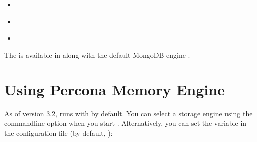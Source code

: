\documentclass[letterpaper,10pt,english]{sphinxmanual}
\begin{document}
\begin{sphinxShadowBox}
\begin{itemize}
\item {} 
\sphinxAtStartPar
{}\label{\detokenize{inmemory:id3}}{\hyperref[\detokenize{inmemory:using-percona-memory-engine}]{}}

\item {} 
\sphinxAtStartPar
{}\label{\detokenize{inmemory:id4}}{\hyperref[\detokenize{inmemory:switching-storage-engines}]{}}

\item {} 
\sphinxAtStartPar
{}\label{\detokenize{inmemory:id5}}{\hyperref[\detokenize{inmemory:configuring-percona-memory-engine}]{}}

\end{itemize}
\end{sphinxShadowBox}

\sphinxAtStartPar
The  is available in  along with the default
MongoDB engine .


\section{Using Percona Memory Engine}
\label{\detokenize{inmemory:using-percona-memory-engine}}
\sphinxAtStartPar
As of version 3.2,  runs with  by default.  You can select a
storage engine using the  command\sphinxhyphen{}line option when you start
.  Alternatively, you can set the  variable in the
configuration file (by default, ):

\begin{sphinxVerbatim}[commandchars=\\\{\}]
\end{sphinxVerbatim}
\end{document}
